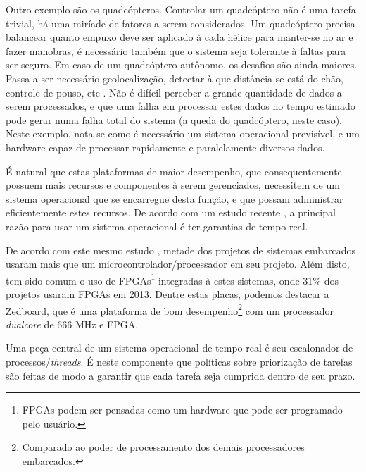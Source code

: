 Outro exemplo são os quadcópteros. Controlar um quadcóptero não é uma tarefa trivial, há uma miríade de fatores a serem considerados. Um quadcóptero precisa balancear quanto empuxo deve ser aplicado à cada hélice para manter-se no ar e fazer manobras, é necessário também que o sistema seja tolerante à faltas para ser seguro. Em caso de um quadcóptero autônomo, os desafios são ainda maiores. Passa a ser necessário geolocalização, detectar à que distância se está do chão, controle de pouso, etc \cite{leeseshia}.
Não é difícil perceber a grande quantidade de dados a serem processados, e que uma falha em processar estes dados no tempo estimado pode gerar numa falha total do sistema (a queda do quadcóptero, neste caso). Neste exemplo, nota-se como é necessário um sistema operacional previsível, e um hardware capaz de processar rapidamente e paralelamente diversos dados.



É natural que estas plataformas de maior desempenho, que consequentemente possuem mais recursos e componentes à serem gerenciados, necessitem de um sistema operacional que se encarregue desta função, e que possam administrar eficientemente estes recursos.
De acordo com um estudo recente \cite{UBM}, a principal razão para usar um sistema operacional é ter garantias de tempo real.

De acordo com este mesmo estudo \cite{UBM}, metade dos projetos de sistemas embarcados usaram mais que um microcontrolador/processador em seu projeto.
Além disto, tem sido comum o uso de FPGAs\footnote{FPGAs podem ser pensadas como um hardware que pode ser programado pelo usuário.} integradas à estes sistemas, onde 31\% dos projetos usaram FPGAs em 2013.
Dentre estas placas, podemos destacar a Zedboard, que é uma plataforma de bom desempenho\footnote{Comparado ao poder de processamento dos demais processadores embarcados.} com um processador \emph{dualcore} de 666 MHz e FPGA.


Uma peça central de um sistema operacional de tempo real é seu escalonador de processos/\emph{threads}. É neste componente que políticas sobre priorização de tarefas são feitas de modo a garantir que cada tarefa seja cumprida dentro de seu prazo.

